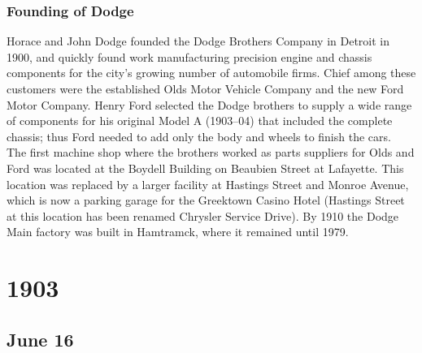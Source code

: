 \documentclass[11pt]{report}
\begin{document}
\subsection{Founding of Dodge}
Horace and John Dodge founded the Dodge Brothers Company in Detroit in 1900, and quickly found work manufacturing precision engine and chassis components for the city's growing number of automobile firms. Chief among these customers were the established Olds Motor Vehicle Company and the new Ford Motor Company. Henry Ford selected the Dodge brothers to supply a wide range of components for his original Model A (1903–04) that included the complete chassis; thus Ford needed to add only the body and wheels to finish the cars.\\ \indent The first machine shop where the brothers worked as parts suppliers for Olds and Ford was located at the Boydell Building on Beaubien Street at Lafayette. This location was replaced by a larger facility at Hastings Street and Monroe Avenue, which is now a parking garage for the Greektown Casino Hotel (Hastings Street at this location has been renamed Chrysler Service Drive). By 1910 the Dodge Main factory was built in Hamtramck, where it remained until 1979.

\chapter{1903}
\section{June 16}
\end{document}
